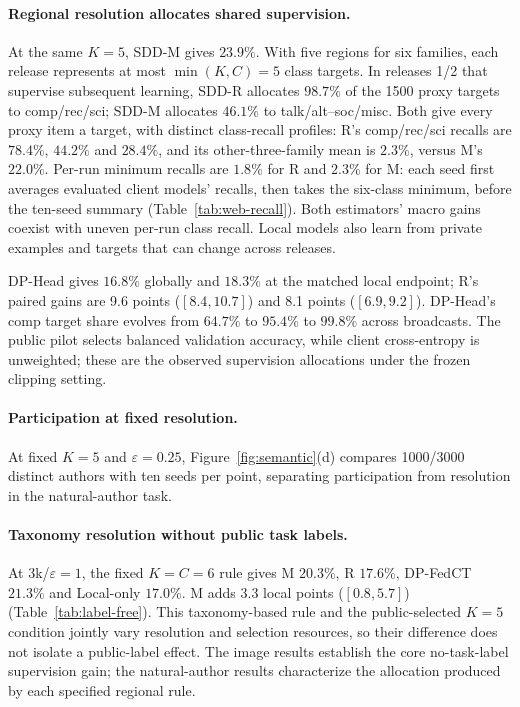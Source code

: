 \paragraph{Regional resolution allocates shared supervision.}
At the same $K=5$, SDD-M gives $23.9\%$. With five regions for six families,
each release represents at most $\min(K,C)=5$ class targets. In releases 1/2
that supervise subsequent learning, SDD-R allocates $98.7\%$ of the 1500
proxy targets to comp/rec/sci; SDD-M allocates $46.1\%$ to talk/alt--soc/misc.
Both give every proxy item a target, with distinct class-recall profiles:
R's comp/rec/sci recalls are $78.4\%$, $44.2\%$ and $28.4\%$, and its
other-three-family mean is $2.3\%$, versus M's $22.0\%$.
Per-run minimum recalls are $1.8\%$ for R and $2.3\%$ for M: each seed
first averages evaluated client models' recalls, then takes the six-class
minimum, before the ten-seed summary (Table~\ref{tab:web-recall}). Both
estimators' macro gains coexist with uneven per-run class recall. Local models
also learn from private examples and targets that can change across releases.

DP-Head gives $16.8\%$ globally and $18.3\%$ at the matched local endpoint;
R's paired gains are 9.6 points ($[8.4,10.7]$) and 8.1 points ($[6.9,9.2]$).
DP-Head's comp target share evolves from $64.7\%$ to $95.4\%$ to $99.8\%$ across
broadcasts. The public pilot selects balanced validation accuracy, while client
cross-entropy is unweighted; these are the observed supervision allocations
under the frozen clipping setting.

\paragraph{Participation at fixed resolution.}
At fixed $K=5$ and $\varepsilon=0.25$, Figure~\ref{fig:semantic}(d) compares
1000/3000 distinct authors with ten seeds per point, separating participation
from resolution in the natural-author task.

\paragraph{Taxonomy resolution without public task labels.}
At 3k/$\varepsilon=1$, the fixed $K=C=6$ rule gives M $20.3\%$,
R $17.6\%$, DP-FedCT $21.3\%$ and Local-only $17.0\%$.
M adds 3.3 local points ($[0.8,5.7]$) (Table~\ref{tab:label-free}).
This taxonomy-based rule and the public-selected $K=5$ condition jointly vary
resolution and selection resources, so their difference does not isolate a
public-label effect. The image results establish the core no-task-label
supervision gain; the natural-author results characterize the allocation
produced by each specified regional rule.

